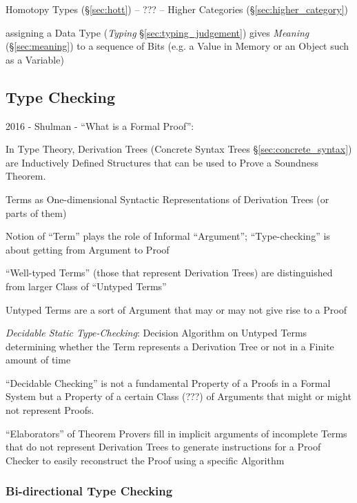 Homotopy Types (\S\ref{sec:hott}) -- ??? -- Higher Categories
(\S\ref{sec:higher_category})

assigning a Data Type (\emph{Typing} \S\ref{sec:typing_judgement})
gives \emph{Meaning} (\S\ref{sec:meaning}) to a sequence of Bits (e.g.
a Value in Memory or an Object such as a Variable)





\subsection{Type Checking}\label{sec:type_checking}

2016 - Shulman - ``What is a Formal Proof'': %

In Type Theory, Derivation Trees (Concrete Syntax Trees
\S\ref{sec:concrete_syntax}) are Inductively Defined Structures that
can be used to Prove a Soundness Theorem.

Terms as One-dimensional Syntactic Representations of Derivation Trees
(or parts of them)

Notion of ``Term'' plays the role of Informal ``Argument'';
``Type-checking'' is about getting from Argument to Proof

``Well-typed Terms'' (those that represent Derivation Trees) are
distinguished from larger Class of ``Untyped Terms''

Untyped Terms are a sort of Argument that may or may not give rise to
a Proof

\emph{Decidable Static Type-Checking}: Decision Algorithm on Untyped
Terms determining whether the Term represents a Derivation Tree or not
in a Finite amount of time

``Decidable Checking'' is not a fundamental Property of a Proofs in a
Formal System but a Property of a certain Class (???) of Arguments
that might or might not represent Proofs.

``Elaborators'' of Theorem Provers fill in implicit arguments of
incomplete Terms that do not represent Derivation Trees to generate
instructions for a Proof Checker to easily reconstruct the Proof using
a specific Algorithm



\subsubsection{Bi-directional Type Checking}
\label{sec:bidirectional_checking}

